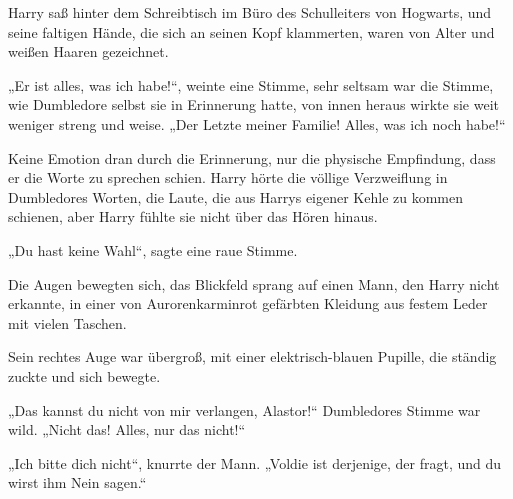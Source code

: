 \begin{em}
Harry saß hinter dem Schreibtisch im Büro des Schulleiters von Hogwarts, und seine faltigen Hände, die sich an seinen Kopf klammerten, waren von Alter und weißen Haaren gezeichnet.

„Er ist alles, was ich habe!“, weinte eine Stimme, sehr seltsam war die Stimme, wie Dumbledore selbst sie in Erinnerung hatte, von innen heraus wirkte sie weit weniger streng und weise.
„Der Letzte meiner Familie! Alles, was ich noch habe!“

Keine Emotion dran durch die Erinnerung, nur die physische Empfindung, dass er die Worte zu sprechen schien. Harry hörte die völlige Verzweiflung in Dumbledores Worten, die Laute, die aus Harrys eigener Kehle zu kommen schienen, aber Harry fühlte sie nicht über das Hören hinaus.

„Du hast keine Wahl“, sagte eine raue Stimme.

Die Augen bewegten sich, das Blickfeld sprang auf einen Mann, den Harry nicht erkannte, in einer von Aurorenkarminrot gefärbten Kleidung aus festem Leder mit vielen Taschen.

Sein rechtes Auge war übergroß, mit einer elektrisch-blauen Pupille, die ständig zuckte und sich bewegte.

„Das kannst du nicht von mir verlangen, Alastor!“ Dumbledores Stimme war wild. „Nicht das! Alles, nur das nicht!“

„Ich bitte dich nicht“, knurrte der Mann. „Voldie ist derjenige, der fragt, und du wirst ihm Nein sagen.“


\end{em}
